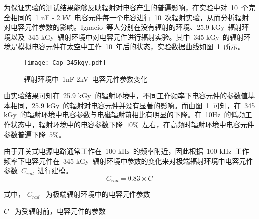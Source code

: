 为保证实验的测试结果能够反映辐射对电容产生的普遍影响，在实验中对~10~个完全相同的~1 nF - 2 kV~电容元件每一个电容进行~10~次辐射实验，从而分析辐射对电容元件参数的影响。Ignacio~等人分别在没有辐射的环境、25.9 kGy~辐射环境以及~345 kGy~辐射环境中对电容元件进行辐射实验。其中~345 kGy~的辐射环境是模拟电容元件在太空中工作~10~年后的状态，实验数据曲线如图~\ref{fig:chap2:cap-345kgy}~所示。
\begin{figure}[h]
  \centering
     \texttt{[image: Cap-345kgy.pdf]}\\
   \caption{辐射环境中~1nF 2kV~电容元件参数变化}\label{fig:chap2:cap-345kgy}
\end{figure}

由实验结果可知在~25.9 kGy~的辐射环境中，不同工作频率下电容元件的参数值基本相同，25.9 kGy~的辐射对电容元件并没有显著的影响。而由图~\ref{fig:chap2:cap-345kgy}~可知，在~345 kGy~的辐射环境中电容参数与电磁辐射前相比有明显的下降。在~10Hz~的低频工作状态中，辐射环境中的电容参数下降~$10\%$~左右，在高频时辐射环境中电容元件参数普遍下降~$5\%$。

由于开关式电源电路通常工作在~100 kHz~的频率附近，因此根据~100 kHz~工作频率下电容元件在~345 kGy~辐射环境中参数的变化来对极端辐射环境中电容元件参数~$C_{rad}$~进行建模。
\begin{equation}\label{equ:chap2:Index8}
  C_{rad}=0.83\times C
\end{equation}

式中，  $C_{rad}$  ~为极端辐射环境中的电容元件参数

\hspace{1.4cm}$C$  \quad ~为受辐射前，电容元件的参数
